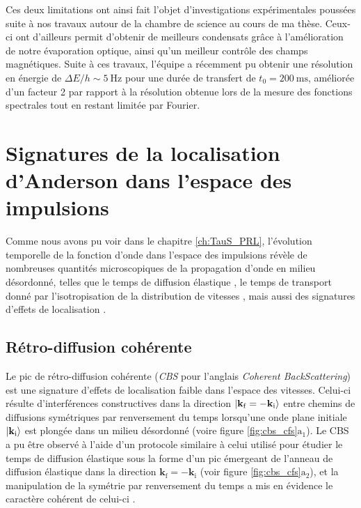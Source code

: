 Ces deux limitations ont ainsi fait l'objet d'investigations expérimentales poussées suite à nos travaux autour de la chambre de science au cours de ma thèse. Ceux-ci ont d'ailleurs permit d'obtenir de meilleurs condensats grâce à l'amélioration de notre évaporation optique, ainsi qu'un meilleur contrôle des champs magnétiques. Suite à ces travaux, l'équipe a récemment pu obtenir une résolution en énergie de $\Delta E/h\sim\SI{5}{\hertz}$ pour une durée de transfert de $t_0=\SI{200}{\milli\second}$, améliorée d'un facteur 2 par rapport à la résolution obtenue lors de la mesure des fonctions spectrales tout en restant limitée par Fourier. 







\section{Signatures de la localisation d'Anderson dans l'espace des impulsions}
Comme nous avons pu voir dans le chapitre \ref{ch:TauS_PRL}, l'évolution temporelle de la fonction d'onde dans l'espace des impulsions révèle de nombreuses quantités microscopiques de la propagation d'onde en milieu désordonné, telles que le temps de diffusion élastique \citep{richard2019elastic}, le temps de transport donné par l'isotropisation de la distribution de vitesses \citep{plisson2013momentum}, mais aussi des signatures d'effets de localisation \citep{cherroret2012coherent}.

\subsection{Rétro-diffusion cohérente}
Le pic de rétro-diffusion cohérente (\emph{CBS} pour l'anglais \emph{Coherent BackScattering}) est une signature d'effets de localisation faible dans l'espace des vitesses. Celui-ci résulte d'interférences constructives dans la direction $\left| \mathbf{k}_{\mathrm{f}}=-\mathbf{k}_{\mathrm{i}} \right\rangle$ entre chemins de diffusions symétriques par renversement du temps lorsqu'une onde plane initiale $\left| \mathbf{k}_{\mathrm{i}} \right\rangle$ est plongée dans un milieu désordonné (voire figure \ref{fig:cbs_cfs}$\mathrm{a_1}$). Le CBS a pu être observé à l'aide d'un protocole similaire à celui utilisé pour étudier le temps de diffusion élastique \citep{jendrzejewski2012coherent} sous la forme d'un pic émergeant de l'anneau de diffusion élastique dans la direction $\mathbf{k}_{\mathrm{f}}=-\mathbf{k}_{\mathrm{i}}$ (voir figure \ref{fig:cbs_cfs}$\mathrm{a_2}$), et la manipulation de la symétrie par renversement du temps a mis en évidence le caractère cohérent de celui-ci \citep{muller2015suppression}.

